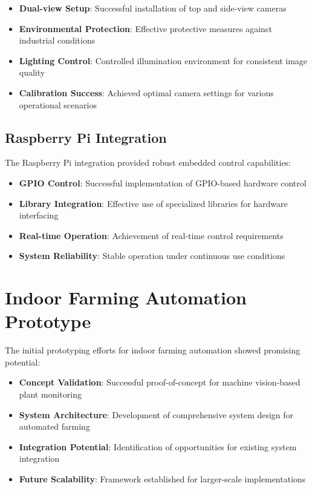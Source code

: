 \documentclass{book}
\begin{document}
\begin{itemize}
\item \textbf{Dual-view Setup}: Successful installation of top and side-view cameras
\item \textbf{Environmental Protection}: Effective protective measures against industrial conditions
\item \textbf{Lighting Control}: Controlled illumination environment for consistent image quality
\item \textbf{Calibration Success}: Achieved optimal camera settings for various operational scenarios
\end{itemize}

\subsection{Raspberry Pi Integration}

\par\noindent The Raspberry Pi integration provided robust embedded control capabilities:

\begin{itemize}
\item \textbf{GPIO Control}: Successful implementation of GPIO-based hardware control
\item \textbf{Library Integration}: Effective use of specialized libraries for hardware interfacing
\item \textbf{Real-time Operation}: Achievement of real-time control requirements
\item \textbf{System Reliability}: Stable operation under continuous use conditions
\end{itemize}

\section{Indoor Farming Automation Prototype}

\par\noindent The initial prototyping efforts for indoor farming automation showed promising potential:

\begin{itemize}
\item \textbf{Concept Validation}: Successful proof-of-concept for machine vision-based plant monitoring
\item \textbf{System Architecture}: Development of comprehensive system design for automated farming
\item \textbf{Integration Potential}: Identification of opportunities for existing system integration
\item \textbf{Future Scalability}: Framework established for larger-scale implementations
\end{itemize}
\end{document}

